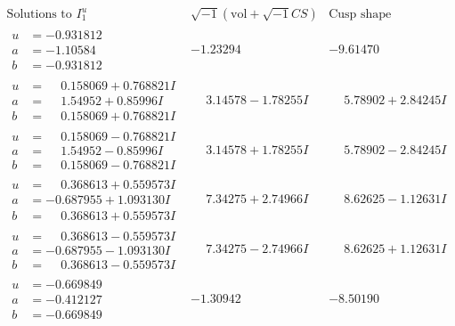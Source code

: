 \documentclass[1p]{elsarticle_modified}
\theoremstyle{definition}
\newcommand{\I}{\sqrt{-1}}
\begin{document}
$$\begin{array}{c|c|c}  
\text{Solutions to }I^u_{1}& \I (\text{vol} + \sqrt{-1}CS) & \text{Cusp shape}\\
 \hline 
\begin{aligned}
u &= -0.931812\phantom{ +0.000000I} \\
a &= -1.10584\phantom{ +0.000000I} \\
b &= -0.931812\phantom{ +0.000000I}\end{aligned}
 & -1.23294\phantom{ +0.000000I} & -9.61470\phantom{ +0.000000I} \\ \hline\begin{aligned}
u &= \phantom{-}0.158069 + 0.768821 I \\
a &= \phantom{-}1.54952 + 0.85996 I \\
b &= \phantom{-}0.158069 + 0.768821 I\end{aligned}
 & \phantom{-}3.14578 - 1.78255 I & \phantom{-}5.78902 + 2.84245 I \\ \hline\begin{aligned}
u &= \phantom{-}0.158069 - 0.768821 I \\
a &= \phantom{-}1.54952 - 0.85996 I \\
b &= \phantom{-}0.158069 - 0.768821 I\end{aligned}
 & \phantom{-}3.14578 + 1.78255 I & \phantom{-}5.78902 - 2.84245 I \\ \hline\begin{aligned}
u &= \phantom{-}0.368613 + 0.559573 I \\
a &= -0.687955 + 1.093130 I \\
b &= \phantom{-}0.368613 + 0.559573 I\end{aligned}
 & \phantom{-}7.34275 + 2.74966 I & \phantom{-}8.62625 - 1.12631 I \\ \hline\begin{aligned}
u &= \phantom{-}0.368613 - 0.559573 I \\
a &= -0.687955 - 1.093130 I \\
b &= \phantom{-}0.368613 - 0.559573 I\end{aligned}
 & \phantom{-}7.34275 - 2.74966 I & \phantom{-}8.62625 + 1.12631 I \\ \hline\begin{aligned}
u &= -0.669849\phantom{ +0.000000I} \\
a &= -0.412127\phantom{ +0.000000I} \\
b &= -0.669849\phantom{ +0.000000I}\end{aligned}
 & -1.30942\phantom{ +0.000000I} & -8.50190\phantom{ +0.000000I} \\ \hline\begin{aligned}

\end{aligned}
\end{array}$$
\end{document}
